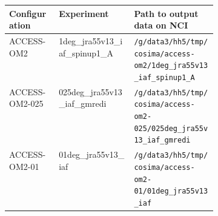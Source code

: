 
\begin{tabularx}{\linewidth}{lXp{0.4\linewidth}}
\hline
\textbf{Configuration} & \textbf{Experiment} & \textbf{Path to output data on NCI} \\
\hline

ACCESS-OM2 & 1deg_jra55v13_iaf_spinup1_A & \texttt{\slash g\slash data3\slash hh5\slash tmp\slash cosima\slash access-om2\slash 1deg_jra55v13_iaf_spinup1_A}\\
ACCESS-OM2-025 & 025deg_jra55v13_iaf_gmredi & \texttt{\slash g\slash data3\slash hh5\slash tmp\slash cosima\slash access-om2-025\slash 025deg_jra55v13_iaf_gmredi}\\
ACCESS-OM2-01 & 01deg_jra55v13_iaf & \texttt{\slash g\slash data3\slash hh5\slash tmp\slash cosima\slash access-om2-01\slash 01deg_jra55v13_iaf}\\

\hline
\hline
\end{tabularx}
